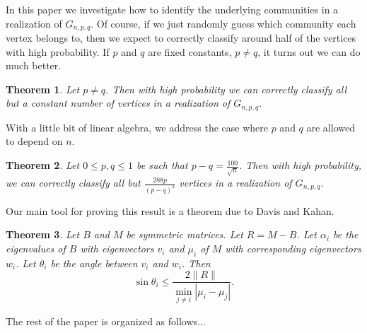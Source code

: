 \documentclass[11pt,letterpaper]{report}
\newtheorem{theorem}{Theorem}
\begin{document}
In this paper we investigate how to identify the underlying communities in a realization of $G_{n, p, q}$. Of course, if we just randomly guess which community each vertex belongs to, then we expect to correctly classify around half of the vertices with high probability. If $p$ and $q$ are fixed constants, $p\neq q$, it turns out we can do much better.

\begin{theorem}
	Let $p\neq q$. Then with high probability we can correctly classify all but a constant number of vertices in a realization of $G_{n, p, q}$.
\end{theorem}

With a little bit of linear algebra, we address the case where $p$ and $q$ are allowed to depend on $n$.

\begin{theorem}
	Let $0\leq p,q \leq 1$ be such that $p-q = \frac{100}{\sqrt{n}}$. Then with high probability, we can correctly classify all but $\frac{288p}{(p-q)^2}$ vertices in a realization of $G_{n, p, q}$.
\end{theorem}

Our main tool for proving this result is a theorem due to Davis and Kahan.

\begin{theorem}
	Let $B$ and $M$ be symmetric matrices. Let $R = M-B$. Let $\alpha_i$ be the eigenvalues of $B$ with eigenvectors $v_i$ and $\mu_i$ of $M$ with corresponding eigenvectors $w_i$. Let $\theta_i$ be the angle between $v_i$ and $w_i$. Then
	\[
	\sin \theta_i \leq \frac{2\|R\|}{\min_{j\neq i}|\mu_i-\mu_j|}.
	\]
\end{theorem}

The rest of the paper is organized as follows...
\end{document}
